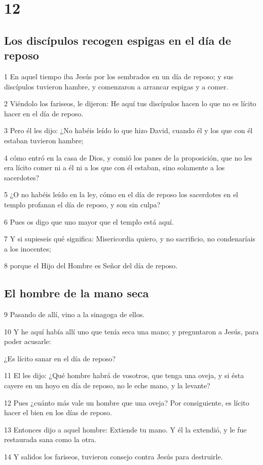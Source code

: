 \chapter{12}

\section*{Los discípulos recogen espigas en el día de reposo}

\par 1 En aquel tiempo iba Jesús por los sembrados en un día de reposo; y sus discípulos tuvieron hambre, y comenzaron a arrancar espigas y a comer.
\par 2 Viéndolo los fariseos, le dijeron: He aquí tus discípulos hacen lo que no es lícito hacer en el día de reposo.
\par 3 Pero él les dijo: ¿No habéis leído lo que hizo David, cuando él y los que con él estaban tuvieron hambre;
\par 4 cómo entró en la casa de Dios, y comió los panes de la proposición, que no les era lícito comer ni a él ni a los que con él estaban, sino solamente a los sacerdotes?
\par 5 ¿O no habéis leído en la ley, cómo en el día de reposo los sacerdotes en el templo profanan el día de reposo, y son sin culpa?
\par 6 Pues os digo que uno mayor que el templo está aquí.
\par 7 Y si supieseis qué significa: Misericordia quiero, y no sacrificio, no condenaríais a los inocentes;
\par 8 porque el Hijo del Hombre es Señor del día de reposo.

\section*{El hombre de la mano seca}

\par 9 Pasando de allí, vino a la sinagoga de ellos.
\par 10 Y he aquí había allí uno que tenía seca una mano; y preguntaron a Jesús, para poder acusarle:
\par ¿Es lícito sanar en el día de reposo?
\par 11 El les dijo: ¿Qué hombre habrá de vosotros, que tenga una oveja, y si ésta cayere en un hoyo en día de reposo, no le eche mano, y la levante?
\par 12 Pues ¿cuánto más vale un hombre que una oveja? Por consiguiente, es lícito hacer el bien en los días de reposo.
\par 13 Entonces dijo a aquel hombre: Extiende tu mano. Y él la extendió, y le fue restaurada sana como la otra.
\par 14 Y salidos los fariseos, tuvieron consejo contra Jesús para destruirle.

